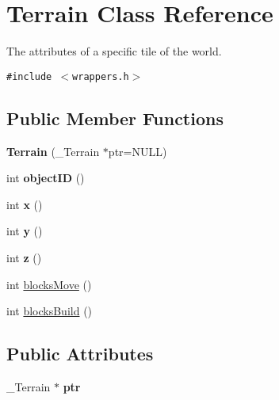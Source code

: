 \hypertarget{classTerrain}{
\section{Terrain Class Reference}
\label{classTerrain}
}
The attributes of a specific tile of the world.  


{\tt \#include $<$wrappers.h$>$}

\subsection*{Public Member Functions}
\begin{CompactItemize}
\item 
\hypertarget{classTerrain_d69f12c1a91d0c3b96d3e5d3006dcef9}{
\textbf{Terrain} (\_\-Terrain $\ast$ptr=NULL)}
\label{classTerrain_d69f12c1a91d0c3b96d3e5d3006dcef9}

\item 
\hypertarget{classTerrain_34577a3c0632bb51515aab9b363a65f1}{
int \textbf{objectID} ()}
\label{classTerrain_34577a3c0632bb51515aab9b363a65f1}

\item 
\hypertarget{classTerrain_ed3254c223a45d3e0f319fcc54add79a}{
int \textbf{x} ()}
\label{classTerrain_ed3254c223a45d3e0f319fcc54add79a}

\item 
\hypertarget{classTerrain_9a4db29382d784d64f6817eb738d9d4c}{
int \textbf{y} ()}
\label{classTerrain_9a4db29382d784d64f6817eb738d9d4c}

\item 
\hypertarget{classTerrain_06173b6758d8adbc82181db2a6306a75}{
int \textbf{z} ()}
\label{classTerrain_06173b6758d8adbc82181db2a6306a75}

\item 
int \hyperlink{classTerrain_80105933c1d08553db9d7c9abca47251}{blocksMove} ()
\item 
int \hyperlink{classTerrain_f2ae042e3aecc89c7746c04e2498e45b}{blocksBuild} ()
\end{CompactItemize}
\subsection*{Public Attributes}
\begin{CompactItemize}
\item 
\hypertarget{classTerrain_8f795aee94e17dc84f3cb22ca877cda9}{
\_\-Terrain $\ast$ \textbf{ptr}}
\label{classTerrain_8f795aee94e17dc84f3cb22ca877cda9}

\end{CompactItemize}
